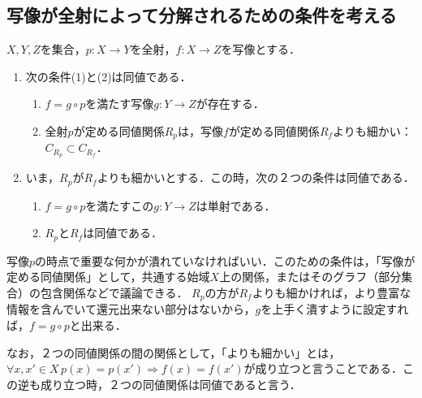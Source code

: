 \documentclass[uplatex,dvipdfmx]{jsreport}
\begin{document}
\subsection{写像が全射によって分解されるための条件を考える}

\begin{proposition}[全射と一般の写像]\label{prop-induced-mapping}
    $X,Y,Z$を集合，$p:X\to Y$を全射，$f:X\to Z$を写像とする．
    \begin{enumerate}
        \item 次の条件(1)と(2)は同値である．
        \begin{enumerate}[(1)]
            \item $f=g\circ p$を満たす写像$g:Y\to Z$が存在する．\begin{center}\end{center}
            \item 全射$p$が定める同値関係$R_p$は，写像$f$が定める同値関係$R_f$よりも細かい：$C_{R_p}\subset C_{R_f}$．
        \end{enumerate}
        \item いま，$R_p$が$R_f$よりも細かいとする．この時，次の２つの条件は同値である．
        \begin{enumerate}[(1)]
            \item $f=g\circ p$を満たすこの$g:Y\to Z$は単射である．
            \item $R_p$と$R_f$は同値である．
        \end{enumerate}
    \end{enumerate}
\end{proposition}
\begin{remark}
    写像$p$の時点で重要な何かが潰れていなければいい．このための条件は，「写像が定める同値関係」として，共通する始域$X$上の関係，またはそのグラフ（部分集合）の包含関係などで議論できる．
    $R_p$の方が$R_f$よりも細かければ，より豊富な情報を含んでいて還元出来ない部分はないから，$g$を上手く潰すように設定すれば，$f=g\circ p$と出来る．

    なお，２つの同値関係の間の関係として，「よりも細かい」とは，$\forall x,x'\in X \, p(x)=p(x')\Rightarrow f(x)=f(x')$が成り立つと言うことである．この逆も成り立つ時，２つの同値関係は同値であると言う．
\end{remark}
\end{document}
